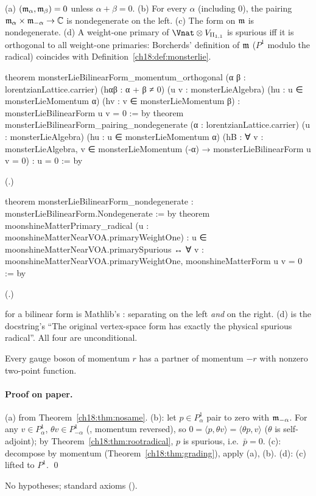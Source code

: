 \begin{theorem}\label{ch18:thm:primaryradical}
(a) $(\mathfrak{m}_\alpha,\mathfrak{m}_\beta)=0$ unless $\alpha+\beta=0$.  (b) For every $\alpha$ (including $0$), the pairing
$\mathfrak{m}_\alpha\times\mathfrak{m}_{-\alpha}\to\mathbb C$ is nondegenerate on the left.  (c) The form on $\mathfrak{m}$ is nondegenerate.  (d) A weight-one
primary of $\Vnat\otimes V_{\chXVIIIII}$ is spurious iff it is orthogonal to all weight-one primaries: Borcherds' definition of
$\mathfrak{m}$ ($P^1$ modulo the radical) coincides with Definition~\ref{ch18:def:monsterlie}.
\end{theorem}
\begin{leancode}
theorem monsterLieBilinearForm_momentum_orthogonal (α β : lorentzianLattice.carrier)
    (hαβ : α + β ≠ 0) (u v : monsterLieAlgebra)
    (hu : u ∈ monsterLieMomentum α) (hv : v ∈ monsterLieMomentum β) :
    monsterLieBilinearForm u v = 0 := by
theorem monsterLieBilinearForm_pairing_nondegenerate (α : lorentzianLattice.carrier)
    (u : monsterLieAlgebra) (hu : u ∈ monsterLieMomentum α)
    (hB : ∀ v : monsterLieAlgebra, v ∈ monsterLieMomentum (-α) →
      monsterLieBilinearForm u v = 0) : u = 0 := by
\end{leancode}
(.)
\begin{leancode}
theorem monsterLieBilinearForm_nondegenerate : monsterLieBilinearForm.Nondegenerate := by
theorem moonshineMatterPrimary_radical (u : moonshineMatterNearVOA.primaryWeightOne) :
    u ∈ moonshineMatterNearVOA.primarySpurious ↔
      ∀ v : moonshineMatterNearVOA.primaryWeightOne, moonshineMatterForm u v = 0 := by
\end{leancode}
(.)
\begin{dictionary}
 for a bilinear form is Mathlib's : separating on the left
\emph{and} on the right.  (d) is the docstring's ``The original vertex-space form has exactly the physical spurious
radical''.  All four are unconditional.
\end{dictionary}
\begin{physics}Every gauge boson of momentum $r$ has a partner of momentum $-r$ with nonzero two-point function.\end{physics}
\paragraph{Proof on paper.}  (a) from Theorem~\ref{ch18:thm:nosame}.  (b): let $p\in P^1_\alpha$ pair to zero with
$\mathfrak{m}_{-\alpha}$.  For any $v\in P^1_\alpha$, $\theta v\in P^1_{-\alpha}$ (, momentum reversed), so
$0=\langle p,\theta v\rangle=\langle\theta p,v\rangle$ ($\theta$ is self-adjoint); by Theorem~\ref{ch18:thm:rootradical}, $p$ is spurious, i.e.\
$\bar p=0$.  (c): decompose by momentum (Theorem~\ref{ch18:thm:grading}), apply (a), (b).  (d): (c) lifted to $P^1$. \qed
\begin{status}No hypotheses; standard axioms (\leanpath{VOA/Moonshine/MoonshineCNAudit11.lean}).\end{status}

